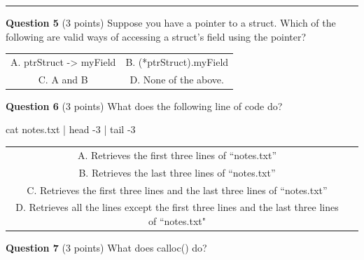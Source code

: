 \documentclass{exam}
\begin{document}
\vspace{10px}

\newpage




\begin{center}\noindent\rule{6in}{0.4pt}\end{center}

\textbf{Question 5} (3 points) Suppose you have a pointer to a struct. Which of the following are valid ways of accessing a struct’s field using the pointer?

\begin{center}

\begin{tabular} { c  c } 
  A. ptrStruct -> myField &
  B. (*ptrStruct).myField \\ 
  C. A and B & 
  D. None of the above.
\end{tabular}

\end{center}

\vspace{10px}

\textbf{Question 6} (3 points) What does the following line of code do?

\begin{center}
cat notes.txt | head -3 | tail -3
\end{center}

\begin{center}

\begin{tabular} { c  c } 
  A. Retrieves the first three lines of “notes.txt” \\
  B. Retrieves the last three lines of “notes.txt” \\ 
  C. Retrieves the first three lines and the last three lines of “notes.txt” \\ 
  D. Retrieves all the lines except the first three lines and the last three lines of “notes.txt"
\end{tabular}

\end{center}

\vspace{10px}

\textbf{Question 7} (3 points) What does calloc() do?
\end{document}
